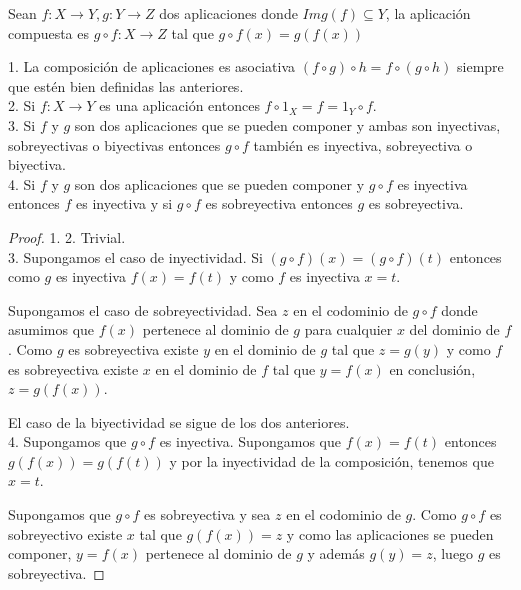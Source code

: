 \begin{definition}
	Sean $f:X \to Y,g:Y \to Z$ dos aplicaciones donde $Img(f) \subseteq Y$, la aplicación compuesta es $g \circ f: X \to Z$ tal que $g \circ f(x) = g(f(x))$
\end{definition}

\begin{proposition}
	1. La composición de aplicaciones es asociativa $(f \circ g) \circ h = f \circ (g \circ h)$ siempre que estén bien definidas las anteriores. \\
	2. Si $f:X \to Y$ es una aplicación entonces $f \circ 1_X = f = 1_Y \circ f$. \\
	3. Si $f$ y $g$ son dos aplicaciones que se pueden componer y ambas son inyectivas, sobreyectivas o biyectivas entonces $g \circ f$ también es inyectiva, sobreyectiva o biyectiva. \\
	4. Si $f$ y $g$ son dos aplicaciones que se pueden componer y $g \circ f$ es inyectiva entonces $f$ es inyectiva y si $g \circ f$ es sobreyectiva entonces $g$ es sobreyectiva. \\
\end{proposition}
\begin{proof}
	1. 2. Trivial. \\
	3. Supongamos el caso de inyectividad. Si $(g \circ f)(x) = (g \circ f)(t)$ entonces como $g$ es inyectiva $f(x) = f(t)$ y como $f$ es inyectiva $x = t$. 
	
	Supongamos el caso de sobreyectividad. Sea $z$ en el codominio de $g \circ f$ donde asumimos que $f(x)$ pertenece al dominio de $g$ para cualquier $x$ del dominio de $f$. Como $g$ es sobreyectiva existe $y$ en el dominio de $g$ tal que $z = g(y)$ y como $f$ es sobreyectiva existe $x$ en el dominio de $f$ tal que $y = f(x)$ en conclusión, $z = g(f(x))$. 
	
	El caso de la biyectividad se sigue de los dos anteriores. \\
	4. Supongamos que $g \circ f$ es inyectiva. Supongamos que $f(x) = f(t)$ entonces $g(f(x)) = g(f(t))$ y por la inyectividad de la composición, tenemos que $x = t$. 
	
	Supongamos que $g \circ f$ es sobreyectiva y sea $z$ en el codominio de $g$. Como $g \circ f$ es sobreyectivo existe $x$ tal que $g(f(x)) = z$ y como las aplicaciones se pueden componer, $y = f(x)$ pertenece al dominio de $g$ y además $g(y) = z$, luego $g$ es sobreyectiva. 
\end{proof}

